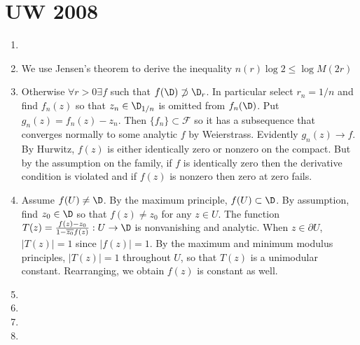 \documentclass[11pt]{book}
\theoremstyle{definition}
\begin{document}
\section{UW 2008}
\begin{enumerate}
\item
\item We use Jensen's theorem to derive the inequality $n(r)\log2\leq \log{M(2r)}$
\item Otherwise $\forall r>0 \exists f$ such that $f(\D)\not\supset \D_r$. In particular select $r_n=1/n$ and find $f_n(z)$ so that $z_n\in \D_{1/n}$ is omitted from $f_n(\D)$. Put $g_n(z)=f_n(z)-z_n$. Then $\{f_n\}\subset\mathcal{F}$ so it has a subsequence that converges normally to some analytic $f$ by Weierstrass. Evidently $g_n(z)\to f$. By Hurwitz, $f(z)$ is either identically zero or nonzero on the compact. But by the assumption on the family, if $f$ is identically zero then the derivative condition is violated and if $f(z)$ is nonzero then zero at zero fails. 
\item Assume $f(U)\neq \D$. By the maximum principle, $f(U)\subset\D$. By assumption, find $z_0\in \D$ so that $f(z)\neq z_0$ for any $z\in U$. The function $T(z)=\frac{f(z)-z_0}{1-\overline{z_0}f(z)}:U\to\D$ is nonvanishing and analytic. When $z\in\partial U$, $|T(z)|=1$ since $|f(z)|=1$. By the maximum and minimum modulus principles, $|T(z)|=1$ throughout $U$, so that $T(z)$ is a unimodular constant. Rearranging, we obtain $f(z)$ is constant as well.
\item
\item
\item
\item
\end{enumerate}
\end{document}
